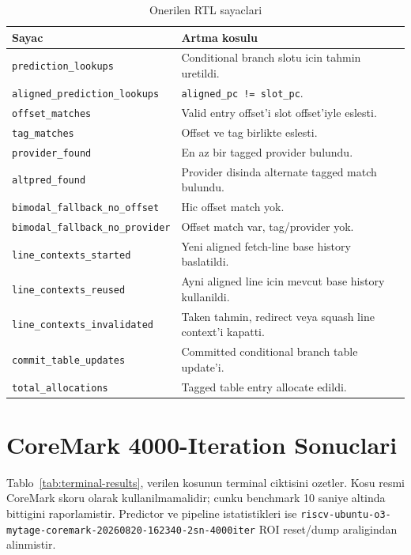 \documentclass[11pt,a4paper]{article}
\newcommand{\code}[1]{\texttt{#1}}
\begin{document}
\begin{table}[!htbp]
\centering
\caption{Onerilen RTL sayaclari}
\label{tab:counters}
\small
\begin{tabularx}{\linewidth}{ll}
\toprule
Sayac & Artma kosulu \\
\midrule
\code{prediction\_lookups} & Conditional branch slotu icin tahmin uretildi. \\
\code{aligned\_prediction\_lookups} & \code{aligned\_pc != slot\_pc}. \\
\code{offset\_matches} & Valid entry offset'i slot offset'iyle eslesti. \\
\code{tag\_matches} & Offset ve tag birlikte eslesti. \\
\code{provider\_found} & En az bir tagged provider bulundu. \\
\code{altpred\_found} & Provider disinda alternate tagged match bulundu. \\
\code{bimodal\_fallback\_no\_offset} & Hic offset match yok. \\
\code{bimodal\_fallback\_no\_provider} & Offset match var, tag/provider yok. \\
\code{line\_contexts\_started} & Yeni aligned fetch-line base history baslatildi. \\
\code{line\_contexts\_reused} & Ayni aligned line icin mevcut base history kullanildi. \\
\code{line\_contexts\_invalidated} & Taken tahmin, redirect veya squash line context'i kapatti. \\
\code{commit\_table\_updates} & Committed conditional branch table update'i. \\
\code{total\_allocations} & Tagged table entry allocate edildi. \\
\bottomrule
\end{tabularx}
\end{table}

\section{CoreMark 4000-Iteration Sonuclari}

Tablo~\ref{tab:terminal-results}, verilen kosunun terminal ciktisini
ozetler. Kosu resmi CoreMark skoru olarak kullanilmamalidir; cunku benchmark
10 saniye altinda bittigini raporlamistir. Predictor ve pipeline istatistikleri
ise \code{riscv-ubuntu-o3-mytage-coremark-20260820-162340-2sn-4000iter}
ROI reset/dump araligindan alinmistir.
\end{document}
